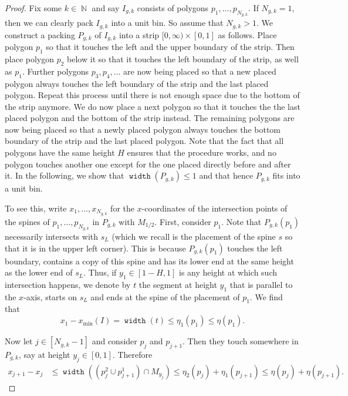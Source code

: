 \documentclass[a4paper,UKenglish,cleveref, autoref, thm-restate]{lipics_v2021}
\DeclareMathOperator{\width}{\mathtt{width}}
\DeclareMathOperator{\N}{\mathbb{N}}
\begin{document}
\begin{proof}
Fix some $k \in \N$ and say $I_{g,k}$ consists of polygons $p_1, \dots, p_{N_{g,k}}$. If $N_{g,k}=1$, then we can clearly pack $I_{g,k}$ into a unit bin. So assume that $N_{g,k} > 1$. We construct a packing $P_{g,k}$ of $I_{g,k}$ into a strip $[0,\infty) \times [0,1]$ as follows. Place polygon $p_1$ so that it touches the left and the upper boundary of the strip. Then place polygon $p_2$ below it so that it touches the left boundary of the strip, as well as $p_1$. Further polygons $p_3, p_4, \dots$ are now being placed so that a new placed polygon always touches the left boundary of the strip and the last placed polygon. Repeat this process until there is not enough space due to the bottom of the strip anymore. We do now place a next polygon so that it touches the the last placed polygon and the bottom of the strip instead. The remaining polygons are now being placed so that a newly placed polygon always touches the bottom boundary of the strip and the last placed polygon. Note that the fact that all polygons have the same height $H$ ensures that the procedure works, and no polygon touches another one except for the one placed directly before and after it. In the following, we show that $\width(P_{g,k}) \leq 1$ and that hence $P_{g,k}$ fits into a unit bin.

To see this, write $x_1, \dots, x_{N_{g,k}}$ for the $x$-coordinates of the intersection points of the spines of $p_1, \dots, p_{N_{g,k}}$ in $P_{g,k}$ with $M_{1/2}$. First, consider $p_1$. Note that $P_{g,k}(p_1)$ necessarily intersects with $s_L$ (which we recall is the placement of the spine $s$ so that it is in the upper left corner). This is because $P_{g,k}(p_1)$ touches the left boundary, contains a copy of this spine and has its lower end at the same height as the lower end of $s_L$. Thus, if $y_1 \in [1-H,1]$ is any height at which such intersection happens, we denote by $t$ the segment at height $y_1$ that is parallel to the $x$-axis, starts on $s_L$ and ends at the spine of the placement of $p_1$. We find that
\[
x_1 - x_{\min}(I) = \width(t) \leq \eta_1(p_1) \leq \eta(p_1).
\]

Now let $j \in [N_{g,k}-1]$ and consider $p_j$ and $p_{j+1}$. Then they touch somewhere in $P_{g,k}$, say at height $y_j \in [0,1]$. Therefore
\begin{align*}
x_{j+1} - x_j &\leq \width((p^2_j \cup p^1_{j+1}) \cap M_{y_j}) \leq \eta_2(p_j) + \eta_1(p_{j+1}) \leq \eta(p_j) + \eta(p_{j+1}).
\end{align*}


\end{proof}
\end{document}
